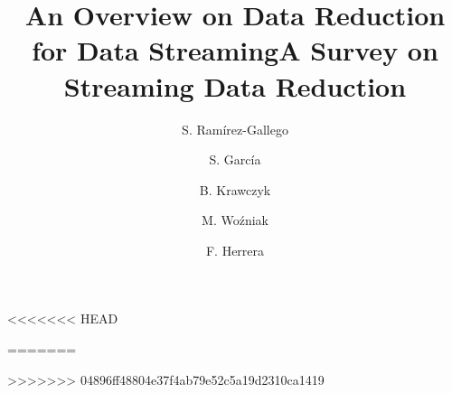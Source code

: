 \documentclass[preprint,12pt]{elsarticle}
\begin{document}
\begin{frontmatter}



<<<<<<< HEAD
\title{An Overview on Data Reduction for Data Streaming}
=======
\title{A Survey on Streaming Data Reduction}
>>>>>>> 04896ff48804e37f4ab79e52c5a19d2310ca1419


\author[ugr]{S. Ram\'{i}rez-Gallego}

\author[ugr]{S. Garc\'ia}

\author[pwr]{B. Krawczyk}

\author[pwr]{M. Wo\'zniak}

\author[ugr]{F. Herrera}

\address[ugr]{Department of Computer Science and Artificial Intelligence, CITIC-UGR, University of Granada, 18071 Granada, Spain}
	
\address[pwr]{Department of Computer Science, Wroc\l{}aw University of Technology, Wyb. Wyspianskiego 27, 50-370 Wroc\l{}aw, Poland}


\begin{abstract}


\end{abstract}
\end{frontmatter}
\end{document}
